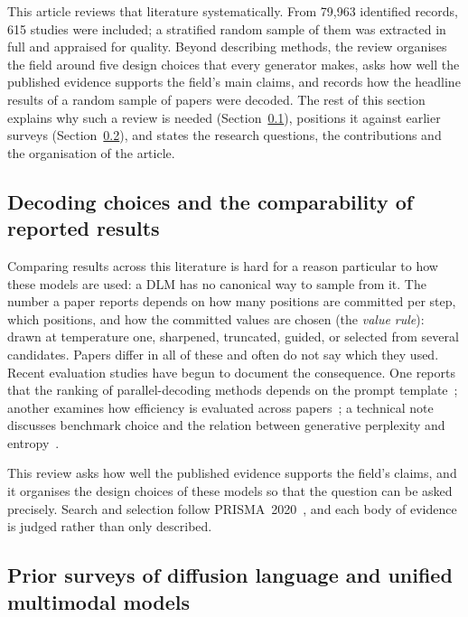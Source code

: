 This article reviews that literature systematically. From 79,963 identified records, 615 studies were included; a stratified random sample of them was extracted in full and appraised for quality. Beyond describing methods, the review organises the field around five design choices that every generator makes, asks how well the published evidence supports the field's main claims, and records how the headline results of a random sample of papers were decoded. The rest of this section explains why such a review is needed (Section~\ref{sec:intro-why}), positions it against earlier surveys (Section~\ref{sec:intro-related}), and states the research questions, the contributions and the organisation of the article.

\subsection{Decoding choices and the comparability of reported results}
\label{sec:intro-why}


Comparing results across this literature is hard for a reason particular to how these models are used: a DLM has no canonical way to sample from it. The number a paper reports depends on how many positions are committed per step, which positions, and how the committed values are chosen (the \emph{value rule}): drawn at temperature one, sharpened, truncated, guided, or selected from several candidates. Papers differ in all of these and often do not say which they used. Recent evaluation studies have begun to document the consequence. One reports that the ranking of parallel-decoding methods depends on the prompt template~\cite{arXiv:2606.29228}; another examines how efficiency is evaluated across papers~\cite{arXiv:2510.18480}; a technical note discusses benchmark choice and the relation between generative perplexity and entropy~\cite{arXiv:2604.02718}. %

This review asks how well the published evidence supports the field's claims, and it organises the design choices of these models so that the question can be asked precisely. Search and selection follow PRISMA~2020~\cite{page2021prisma}, and each body of evidence is judged rather than only described.

\subsection{Prior surveys of diffusion language and unified multimodal models}
\label{sec:intro-related}

